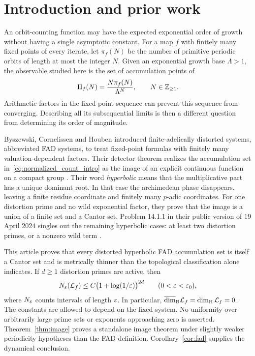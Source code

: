 \section{Introduction and prior work}\label{sec:introduction}

An orbit-counting function may have the expected exponential order of
growth without having a single asymptotic constant. For a map $f$ with
finitely many fixed points of every iterate, let $\pi_f(N)$ be the number
of primitive periodic orbits of length at most the integer $N$. Given an
exponential growth base $\Lambda>1$, the observable studied here is the
set of accumulation points of
\begin{equation}\label{eq:normalized_count_intro}
  \Pi_f(N)=\frac{N\pi_f(N)}{\Lambda^N},\qquad N\in\mathbb Z_{\geq1}.
\end{equation}
Arithmetic factors in the fixed-point sequence can prevent this sequence
from converging. Describing all its subsequential limits is then a
different question from determining its order of magnitude.

Byszewski, Cornelissen and Houben introduced finite-adelically distorted
systems, abbreviated FAD systems, to treat fixed-point formulas with
finitely many valuation-dependent factors. Their detector theorem realizes
the accumulation set in~\eqref{eq:normalized_count_intro} as the image of
an explicit continuous function on a compact group
\cite[Definitions 7.1.1--7.1.2 and Theorem 12.4.3]{bch2024}.
Their word \emph{hyperbolic} means that the multiplicative part has a
unique dominant root. In that case the archimedean phase disappears,
leaving a finite residue coordinate and finitely many $p$-adic coordinates.
For one distortion prime and no wild exponential factor, they prove that
the image is a union of a finite set and a Cantor set. Problem 14.1.1 in
their public version of 19 April 2024 singles out the remaining hyperbolic
cases: at least two distortion primes, or a nonzero wild term
\cite[Theorem 12.5.2, Remark 12.5.3 and Problem 14.1.1]{bch2024}.

This article proves that every distorted hyperbolic FAD accumulation set
is itself a Cantor set and is metrically thinner than the topological
classification alone indicates. If $d\geq1$ distortion primes are active,
then
\begin{equation}\label{eq:cover_intro}
  N_{\varepsilon}(\mathcal L_f)\leq C\bigl(1+\log(1/\varepsilon)\bigr)^{2d}
  \qquad(0<\varepsilon<\varepsilon_0),
\end{equation}
where $N_{\varepsilon}$ counts intervals of length $\varepsilon$. In particular,
$\overline{\dim}_{\mathrm B}\mathcal L_f=\dim_{\mathrm H}\mathcal L_f=0$.
The constants are allowed to depend on the fixed system. No uniformity
over arbitrarily large prime sets or exponents approaching zero is asserted.
Theorem~\ref{thm:image} proves a standalone image theorem under slightly
weaker periodicity hypotheses than the FAD definition.
Corollary~\ref{cor:fad} supplies the dynamical conclusion.

